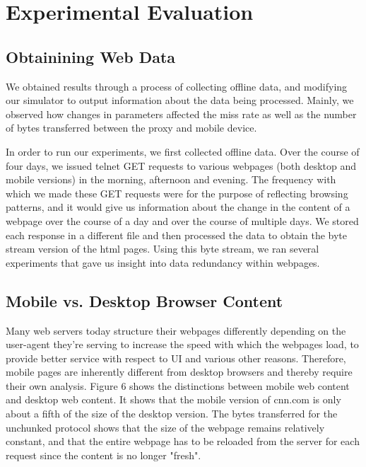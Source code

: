 \section{Experimental Evaluation}
\label{sec:eval}

\subsection{Obtainining Web Data}
We obtained results through a process of collecting offline data, and modifying our simulator to output information about the data being processed. 
Mainly, we observed how changes in parameters affected the miss rate as well as the number of bytes transferred between the proxy and mobile device.

In order to run our experiments, we first collected offline data. 
Over the course of four days, we issued telnet GET requests to various webpages (both desktop and mobile versions) in the morning, afternoon and evening. 
The frequency with which we made these GET requests were for the purpose of reflecting browsing patterns, and it would give us information about the change in the content of a webpage over the course of a day and over the course of multiple days. 
We stored each response in a different file and then processed the data to obtain the byte stream version of the html pages. 
Using this byte stream, we ran several experiments that gave us insight into data redundancy within webpages.

\subsection{Mobile vs. Desktop Browser Content}
Many web servers today structure their webpages differently depending on the user-agent they're serving to increase the speed with which the webpages load, to provide better service with respect to UI and various other reasons. 
Therefore, mobile pages are inherently different from desktop browsers and thereby require their own analysis. 
Figure 6 shows the distinctions between mobile web content and desktop web content. It shows that the mobile version of cnn.com is only about a fifth of the size of the desktop version. 
The bytes transferred for the unchunked protocol shows that the size of the webpage remains relatively constant, and that the entire webpage has to be reloaded from the server for each request since the content is no longer "fresh". 

